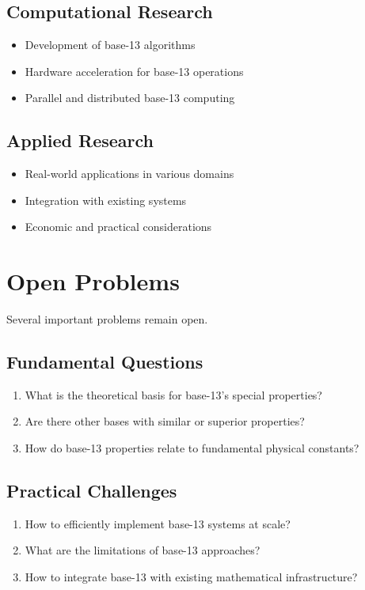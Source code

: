 \documentclass[12pt,a4paper]{report}
\begin{document}
\subsection{Computational Research}

\begin{itemize}
\item Development of base-13 algorithms
\item Hardware acceleration for base-13 operations
\item Parallel and distributed base-13 computing
\end{itemize}

\subsection{Applied Research}

\begin{itemize}
\item Real-world applications in various domains
\item Integration with existing systems
\item Economic and practical considerations
\end{itemize}

\section{Open Problems}

Several important problems remain open.

\subsection{Fundamental Questions}

\begin{enumerate}
\item What is the theoretical basis for base-13's special properties?
\item Are there other bases with similar or superior properties?
\item How do base-13 properties relate to fundamental physical constants?
\end{enumerate}

\subsection{Practical Challenges}

\begin{enumerate}
\item How to efficiently implement base-13 systems at scale?
\item What are the limitations of base-13 approaches?
\item How to integrate base-13 with existing mathematical infrastructure?
\end{enumerate}
\end{document}
